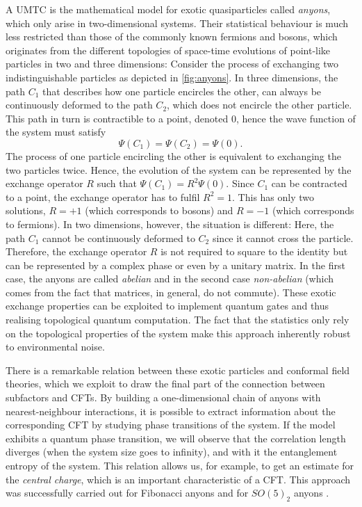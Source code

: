 A UMTC is the mathematical model for exotic quasiparticles called \emph{anyons}, which only arise in two-dimensional systems. Their statistical behaviour is much less restricted than those of the commonly known fermions and bosons, which originates from the different topologies of space-time evolutions of point-like particles in two and three dimensions: Consider the process of exchanging two indistinguishable particles as depicted in \cref{fig:anyons}. In three dimensions, the path $C_1$ that describes how one particle encircles the other, can always be continuously deformed to the path $C_2$, which does not encircle the other particle. This path in turn is contractible to a point, denoted $0$, hence the wave function of the system must satisfy
	\begin{equation}
		\Psi(C_1)=\Psi(C_2)=\Psi(0).
	\end{equation}
The process of one particle encircling the other is equivalent to exchanging the two particles twice. Hence, the evolution of the system can be represented by the exchange operator $R$ such that $\Psi(C_1)=R^2\Psi(0)$. Since $C_1$ can be contracted to a point, the exchange operator has to fulfil $R^2=1$. This has only two solutions, $R=+1$ (which corresponds to bosons) and $R=-1$ (which corresponds to fermions). In two dimensions, however, the situation is different: Here, the path $C_1$ cannot be continuously deformed to $C_2$ since it cannot cross the particle. Therefore, the exchange operator $R$ is not required to square to the identity but can be represented by a complex phase or even by a unitary matrix. In the first case, the anyons are called \emph{abelian} and in the second case \emph{non-abelian} (which comes from the fact that matrices, in general, do not commute). These exotic exchange properties can be exploited to implement quantum gates and thus realising topological quantum computation. The fact that the statistics only rely on the topological properties of the system make this approach inherently robust to environmental noise.

There is a remarkable relation between these exotic particles and conformal field theories, which we exploit to draw the final part of the connection between subfactors and CFTs. By building a one-dimensional chain of anyons with nearest-neighbour interactions, it is possible to extract information about the corresponding CFT by studying phase transitions of the system. If the model exhibits a quantum phase transition, we will observe that the correlation length diverges (when the system size goes to infinity), and with it the entanglement entropy of the system. This relation allows us, for example, to get an estimate for the \emph{central charge}, which is an important characteristic of a CFT. This approach was successfully carried out for Fibonacci anyons \cite{feiguin_interacting_2007} and for $SO(5)_2$ anyons \cite{Finch2014}. 

